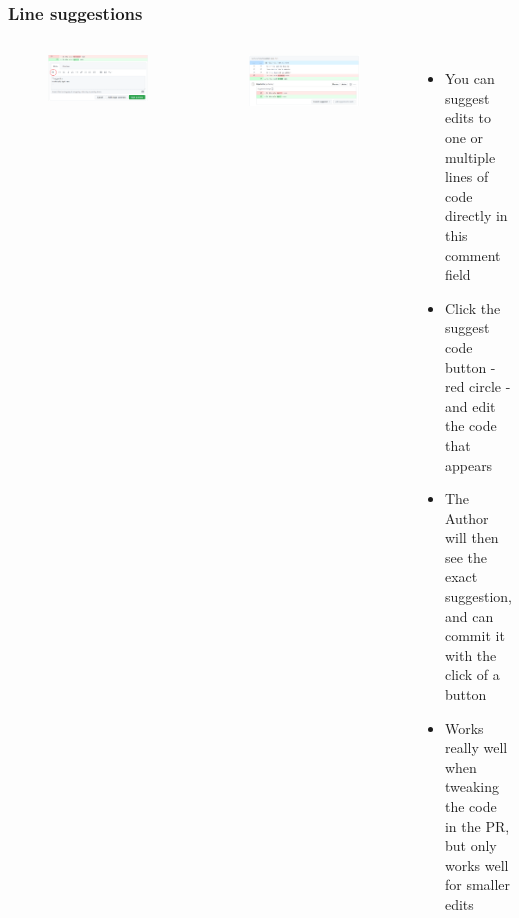 \documentclass[aspectratio=169]{beamer} %
\begin{document}
\begin{frame}
	\frametitle{Line suggestions}
	\begin{columns}[c]

		\vspace{-.6cm}
		\begin{figure}
			\centering
			\includegraphics[width=\textwidth]{./img/suggestion-1.png}
		\end{figure}
		\vspace{-.3cm}
		\begin{figure}
			\centering
			\includegraphics[width=\textwidth]{./img/suggestion-2.png}
		\end{figure}

		\begin{itemize}
			\setlength\itemsep{.74em}
			\item You can suggest edits to one or multiple lines of code 
			directly in this comment field
			
			\item Click the suggest code button - red circle - 
			and edit the code that appears
			
			\item The Author will then see the exact suggestion, 
			and can commit it with the click of a button
			
			\item Works really well when tweaking the code in the PR,
			but only works well for smaller edits
		\end{itemize}

	\end{columns}
\end{frame}
\end{document}
